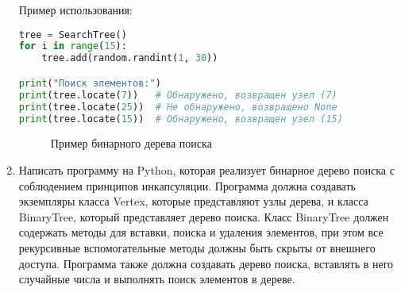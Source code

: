\begin{enumerate}
Пример использования:
\begin{lstlisting}[language=Python]
tree = SearchTree()
for i in range(15):
    tree.add(random.randint(1, 30))

print("Поиск элементов:")
print(tree.locate(7))   # Обнаружено, возвращен узел (7)
print(tree.locate(25))  # Не обнаружено, возвращено None
print(tree.locate(15))  # Обнаружено, возвращен узел (15)
\end{lstlisting}

\begin{figure}[h]
\centering
{}
\caption{Пример бинарного дерева поиска}
\end{figure}

\item Написать программу на Python, которая реализует бинарное дерево поиска с соблюдением принципов инкапсуляции. Программа должна создавать экземпляры класса Vertex, которые представляют узлы дерева, и класса BinaryTree, который представляет дерево поиска. Класс BinaryTree должен содержать методы для вставки, поиска и удаления элементов, при этом все рекурсивные вспомогательные методы должны быть скрыты от внешнего доступа. Программа также должна создавать дерево поиска, вставлять в него случайные числа и выполнять поиск элементов в дереве.


\end{enumerate}
